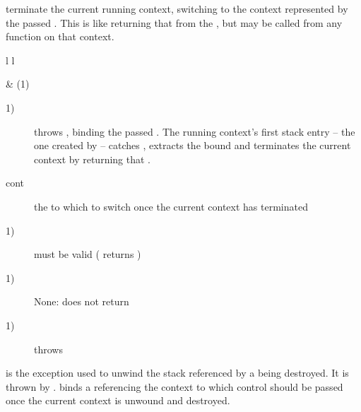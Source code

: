 
terminate the current running context, switching to the context represented by
the passed \cont. This is like returning that \cont from the \entryfn, but may
be called from any function on that context.

\begin{tabular}{ l l }
    \midrule

     & (1)\\

    \midrule
\end{tabular}

\begin{description}
    \item[1)] throws \unwindex, binding the passed \cont. The running context's
              first stack entry -- the one created by \callcc -- catches
              \unwindex, extracts the bound \cont and terminates the current
              context by returning that \cont.
\end{description}

\begin{description}
    \item[cont] the \cont to which to switch once the current context has terminated
\end{description}

\begin{description}
    \item[1)]  must be valid ( returns )
\end{description}

\begin{description}
    \item[1)] None: \unwindcont does not return
\end{description}

\begin{description}
    \item[1)] throws \unwindex
\end{description}



is the exception used to unwind the stack referenced by a \cont being destroyed.
It is thrown by \unwindcont. \unwindex binds a \cont referencing the context to
which control should be passed once the current context is unwound and destroyed.


